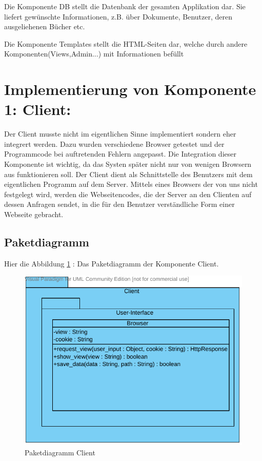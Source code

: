 Die Komponente DB stellt die Datenbank der gesamten Applikation dar.
Sie liefert gewünschte Informationen, z.B. über Dokumente, Benutzer, deren 
ausgeliehenen Bücher etc.

Die Komponente Templates stellt die HTML-Seiten dar, welche durch andere 
Komponenten(Views,Admin...) mit Informationen befüllt    



\section{Implementierung von Komponente
         1: Client:}


Der Client musste nicht im eigentlichen Sinne implementiert sondern eher
integrert werden. Dazu wurden verschiedene Browser getestet und der
Programmcode bei auftretenden Fehlern angepasst. Die Integration dieser
Komponente ist wichtig, da das Systen später nicht nur von wenigen Browsern aus
funktionieren soll.
Der Client dient als Schnittstelle des Benutzers mit dem eigentlichen Programm
auf dem Server. Mittels eines Browsers der von uns nicht festgelegt wird, werden
die Webseitencodes, die der Server an den Clienten auf dessen Anfragen sendet,
in die für den Benutzer verständliche Form einer Webseite gebracht.

\subsection{Paketdiagramm}
Hier die Abbildung \ref{fig:PDclient} : Das Paketdiagramm der Komponente Client.
\begin{figure}[!htb]
\includegraphics[width=0.8\linewidth]{bilder/Paketdiagramm_client.pdf}
\caption{Paketdiagramm Client}
\label{fig:PDclient}
\end{figure}
